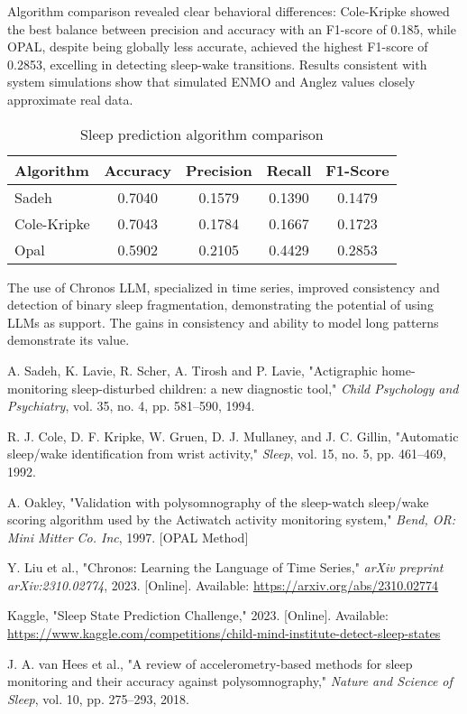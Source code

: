 \documentclass[conference]{IEEEtran}
\begin{document}
Algorithm comparison revealed clear behavioral differences: Cole-Kripke showed the best balance between precision and accuracy with an F1-score of 0.185, while OPAL, despite being globally less accurate, achieved the highest F1-score of 0.2853, excelling in detecting sleep-wake transitions. Results consistent with system simulations show that simulated ENMO and Anglez values closely approximate real data.

\begin{table}[H]
\centering
\caption{Sleep prediction algorithm comparison}
\begin{tabular}{|l|c|c|c|c|}
\hline
\textbf{Algorithm} & \textbf{Accuracy} & \textbf{Precision} & \textbf{Recall} & \textbf{F1-Score} \\
\hline
Sadeh        & 0.7040 & 0.1579 & 0.1390 & 0.1479 \\
Cole-Kripke  & 0.7043 & 0.1784 & 0.1667 & 0.1723 \\
Opal         & 0.5902 & 0.2105 & 0.4429 & 0.2853 \\
\hline
\end{tabular}
\label{tab:alg_comparison}
\end{table}

The use of Chronos LLM, specialized in time series, improved consistency and detection of binary sleep fragmentation, demonstrating the potential of using LLMs as support. The gains in consistency and ability to model long patterns demonstrate its value.

\begin{thebibliography}{99}

A. Sadeh, K. Lavie, R. Scher, A. Tirosh and P. Lavie,
"Actigraphic home-monitoring sleep-disturbed children: a new diagnostic tool,"
\textit{Child Psychology and Psychiatry}, vol. 35, no. 4, pp. 581–590, 1994.

R. J. Cole, D. F. Kripke, W. Gruen, D. J. Mullaney, and J. C. Gillin,
"Automatic sleep/wake identification from wrist activity,"
\textit{Sleep}, vol. 15, no. 5, pp. 461–469, 1992.

A. Oakley,
"Validation with polysomnography of the sleep-watch sleep/wake scoring algorithm used by the Actiwatch activity monitoring system,"
\textit{Bend, OR: Mini Mitter Co. Inc}, 1997. [OPAL Method]

Y. Liu et al., "Chronos: Learning the Language of Time Series," 
\textit{arXiv preprint arXiv:2310.02774}, 2023. [Online]. Available: \url{https://arxiv.org/abs/2310.02774}

Kaggle, "Sleep State Prediction Challenge," 2023. [Online]. Available: \url{https://www.kaggle.com/competitions/child-mind-institute-detect-sleep-states}

J. A. van Hees et al., 
"A review of accelerometry-based methods for sleep monitoring and their accuracy against polysomnography,"
\textit{Nature and Science of Sleep}, vol. 10, pp. 275–293, 2018.

\end{thebibliography}
\end{document}
